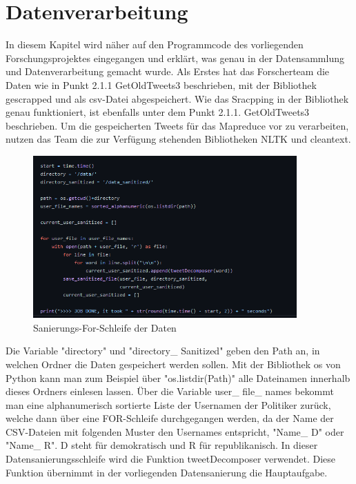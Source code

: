 \section{Datenverarbeitung}
	
	In diesem Kapitel wird näher auf den Programmcode des vorliegenden Forschungsprojektes eingegangen und erklärt, was genau in der Datensammlung und Datenverarbeitung 
	gemacht wurde. 
	Als Erstes hat das Forscherteam die Daten wie in Punkt 2.1.1 GetOldTweets3 beschrieben, mit der Bibliothek gescrapped und als csv-Datei abgespeichert. Wie das Sracpping 
	in der Bibliothek genau funktioniert, ist ebenfalls unter dem Punkt 2.1.1. GetOldTweets3 beschrieben. Um die gespeicherten Tweets für das Mapreduce vor zu verarbeiten, 
	nutzen das Team die zur Verfügung stehenden Bibliotheken NLTK und cleantext.
	
	
	\begin{figure}[ht]
		\centering
		\includegraphics[width=0.9\textwidth]{images/Kapitel2/Code_Datensanierung_1}
		\caption{\label{fig:DataSan}Sanierungs-For-Schleife der Daten}
	\end{figure}
	
	Die Variable "directory" und "directory\_ Sanitized" geben den Path an, in welchen Ordner die Daten gespeichert werden sollen. Mit der Bibliothek os von Python kann man 
	zum Beispiel über "os.listdir(Path)" alle Dateinamen innerhalb dieses Ordners einlesen lassen. 
	Über die Variable user\_ file\_ names bekommt man eine alphanumerisch sortierte Liste der Usernamen der Politiker zurück, welche dann über eine FOR-Schleife durchgegangen 
	werden, da der Name der CSV-Dateien mit folgenden Muster den Usernames entspricht, "Name\_ D" oder "Name\_ R". D steht für demokratisch und R für 
	republikanisch. In dieser Datensanierungsschleife wird die Funktion tweetDecomposer verwendet. Diese Funktion übernimmt in der vorliegenden Datensanierung die 
	Hauptaufgabe.\\
	
